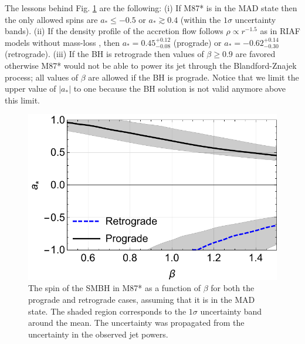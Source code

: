 \documentclass[twocolumn, linenumbers]{aastex62} %
\begin{document}
The lessons behind Fig. \ref{spins} are the following: (i) If M87* is in the MAD state then the only allowed spins are $a_* \leq -0.5$ or $a_* \gtrsim 0.4$ (within the $1\sigma$ uncertainty bands). (ii) If the density profile of the accretion flow follows $\rho \propto r^{-1.5}$ as in RIAF models without mass-loss , then $a_* = 0.45^{+0.12}_{-0.08}$ (prograde) or $a_* = -0.62^{+0.14}_{-0.30}$ (retrograde). (iii) If the BH is retrograde then values of $\beta \geq 0.9$ are favored otherwise M87* would not be able to power its jet through the Blandford-Znajek process; all values of $\beta$ are allowed if the BH is prograde.
Notice that we limit the upper value of $|a_*|$ to one because the BH solution is not valid anymore above this limit.

\begin{figure}[h]
\centering
\includegraphics[width=\linewidth]{figures/spins-MAD.pdf}
\caption{The spin of the SMBH in M87* as a function of $\beta$ for both the prograde and retrograde cases, assuming that it is in the MAD state. The shaded region corresponds to the $1\sigma$ uncertainty band around the mean. The uncertainty was propagated from the uncertainty in the observed jet powers. }
\label{spins}
\end{figure}
\end{document}
